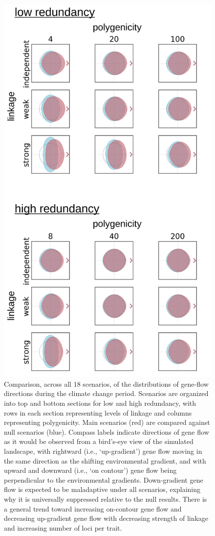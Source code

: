 \documentclass[9pt,twocolumn,twoside,lineno]{pnas-new}
\begin{document}
\begin{figure}
\centering
\includegraphics[width=.8\linewidth]{pub/figs_and_stats/FIG_2_gene_flow.jpg}
    \caption{Comparison, across all 18 scenarios, of the distributions of gene-flow directions during the climate change period. Scenarios are organized into top and bottom sections for low and high redundancy, with rows in each section representing levels of linkage and columns representing polygenicity. Main scenarios (red) are compared against null scenarios (blue). Compass labels indicate directions of gene flow as it would be observed from a bird’s-eye view of the simulated landscape, with rightward (i.e., `up-gradient') gene flow moving in the same direction as the shifting environmental gradient, and with upward and downward (i.e., `on contour’) gene flow being perpendicular to the environmental gradients. Down-gradient gene flow is expected to be maladaptive under all scenarios, explaining why it is universally suppressed relative to the null results. There is a general trend toward increasing on-contour gene flow and decreasing up-gradient gene flow with decreasing strength of linkage and increasing number of loci per trait.
}
\label{fig:fig_2}
\end{figure}
\end{document}
